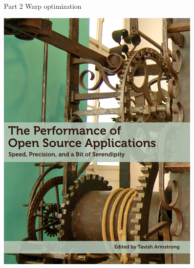 \documentclass[presentation]{beamer}
\begin{document}
\begin{frame}[label={sec:org785492e},fragile]{Part 2 Warp optimization}
 \begin{center}
\includegraphics[width=.9\linewidth]{Part_2_Warp_optimization/2020-08-20_14-51-11_screenshot.png}
\end{center}


\end{frame}
\end{document}
